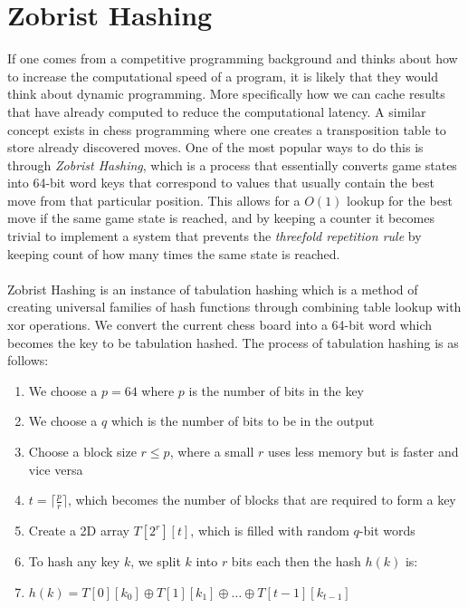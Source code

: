 \section{Zobrist Hashing}
If one comes from a competitive programming background and thinks about how to increase the computational speed of a program, it is likely that they would think about dynamic programming. More specifically how we can cache results that have already computed to reduce the computational latency. A similar concept exists in chess programming where one creates a transposition table to store already discovered moves. One of the most popular ways to do this is through \textit{Zobrist Hashing}, which is a process that essentially converts game states into 64-bit word keys that correspond to values that usually contain the best move from that particular position. This allows for a $O(1)$ lookup for the best move if the same game state is reached, and by keeping a counter it becomes trivial to implement a system that prevents the \textit{threefold repetition rule} by keeping count of how many times the same state is reached.\\\\
Zobrist Hashing is an instance of tabulation hashing which is a method of creating universal families of hash functions through combining table lookup with xor operations. We convert the current chess board into a 64-bit word which becomes the key to be tabulation hashed. The process of tabulation hashing is as follows:
\begin{enumerate}
    \item We choose a $p = 64$ where $p$ is the number of bits in the key
    \item We choose a $q$ which is the number of bits to be in the output
    \item Choose a block size $r \leq p$, where a small $r$ uses less memory but is faster and vice versa
    \item $t = \lceil \frac{p}{r}\rceil$, which becomes the number of blocks that are required to form a key
    \item Create a 2D array $T[2^r][t]$, which is filled with random $q$-bit words
    \item To hash any key $k$, we split $k$ into $r$ bits each then the hash $h(k)$ is:
    \item $h(k) = T[0][k_0] \oplus T[1][k_1] \oplus \dots \oplus T[t - 1][k_{t - 1}]$

\end{enumerate}
